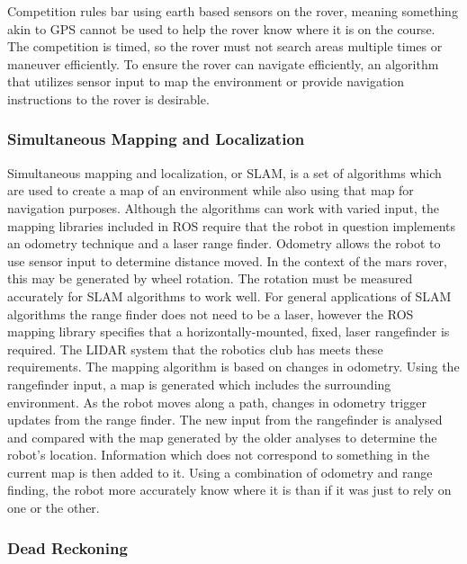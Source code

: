 \documentclass[10pt, oneside,onecolumn]{IEEEtran}
\begin{document}
\begin{titlepage}
Competition rules bar using earth based sensors on the rover, meaning something akin to GPS cannot be used to help the rover know where it is on the course. The competition is timed, so the rover must not search areas multiple times or maneuver efficiently. To ensure the rover can navigate efficiently, an algorithm that utilizes sensor input to map the environment or provide navigation instructions to the rover is desirable. 

\subsubsection{Simultaneous Mapping and Localization}

	Simultaneous mapping and localization, or SLAM, is a set of algorithms which are used to create a map of an environment while also using that map for navigation purposes. Although the algorithms can work with varied input, the mapping libraries included in ROS require that the robot in question implements an odometry technique and a laser range finder. Odometry allows the robot to use sensor input to determine distance moved. In the context of the mars rover, this may be generated by wheel rotation. The rotation must be measured accurately for SLAM algorithms to work well. For general applications of SLAM algorithms the range finder does not need to be a laser, however the ROS mapping library specifies that a horizontally-mounted, fixed, laser rangefinder is required. The LIDAR system that the robotics club has meets these requirements. 
The mapping algorithm is based on changes in odometry. Using the rangefinder input, a map is generated which includes the surrounding environment. As the robot moves along a path, changes in odometry trigger updates from the range finder. The new input from the rangefinder is analysed and compared with the map generated by the older analyses to determine the robot's location. Information which does not correspond to something in the current map is then added to it. Using a combination of odometry and range finding, the robot more accurately know where it is than if it was just to rely on one or the other. 

\subsubsection{Dead Reckoning}


\end{titlepage}
\end{document}
